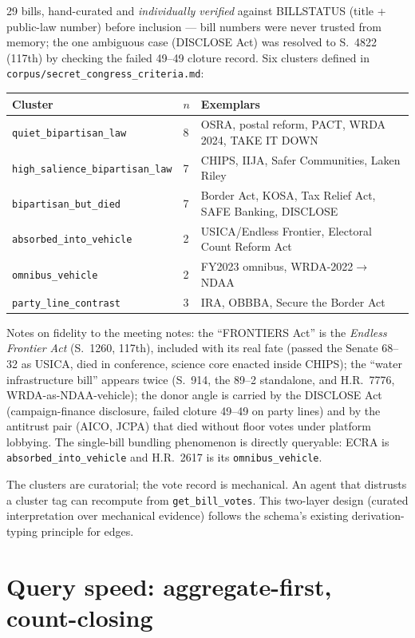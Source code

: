 \documentclass[11pt]{article}
\newcommand{\code}[1]{\texttt{#1}}
\begin{document}
29 bills, hand-curated and \emph{individually verified} against BILLSTATUS
(title + public-law number) before inclusion --- bill numbers were never
trusted from memory; the one ambiguous case (DISCLOSE Act) was resolved to
S.~4822 (117th) by checking the failed 49--49 cloture record. Six clusters
defined in \code{corpus/secret\_congress\_criteria.md}:

\begin{center}
\begin{tabular}{@{}lll@{}}
\toprule
Cluster & $n$ & Exemplars \\
\midrule
\code{quiet\_bipartisan\_law} & 8 & OSRA, postal reform, PACT, WRDA 2024, TAKE IT DOWN \\
\code{high\_salience\_bipartisan\_law} & 7 & CHIPS, IIJA, Safer Communities, Laken Riley \\
\code{bipartisan\_but\_died} & 7 & Border Act, KOSA, Tax Relief Act, SAFE Banking, DISCLOSE \\
\code{absorbed\_into\_vehicle} & 2 & USICA/Endless Frontier, Electoral Count Reform Act \\
\code{omnibus\_vehicle} & 2 & FY2023 omnibus, WRDA-2022$\to$NDAA \\
\code{party\_line\_contrast} & 3 & IRA, OBBBA, Secure the Border Act \\
\bottomrule
\end{tabular}
\end{center}

Notes on fidelity to the meeting notes: the ``FRONTIERS Act'' is the
\emph{Endless Frontier Act} (S.~1260, 117th), included with its real fate
(passed the Senate 68--32 as USICA, died in conference, science core enacted
inside CHIPS); the ``water infrastructure bill'' appears twice (S.~914, the
89--2 standalone, and H.R.~7776, WRDA-as-NDAA-vehicle); the donor angle is
carried by the DISCLOSE Act (campaign-finance disclosure, failed cloture
49--49 on party lines) and by the antitrust pair (AICO, JCPA) that died
without floor votes under platform lobbying. The single-bill bundling
phenomenon is directly queryable: ECRA is \code{absorbed\_into\_vehicle} and
H.R.~2617 is its \code{omnibus\_vehicle}.

The clusters are curatorial; the vote record is mechanical. An agent that
distrusts a cluster tag can recompute from \code{get\_bill\_votes}. This
two-layer design (curated interpretation over mechanical evidence) follows
the schema's existing derivation-typing principle for edges.

\section{Query speed: aggregate-first, count-closing}
\end{document}
